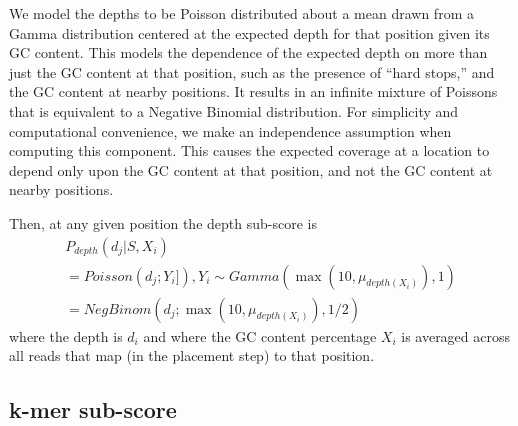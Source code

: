 \documentclass[phd,tocprelim]{cornell}
\begin{document}
We model the depths to be Poisson distributed about a mean drawn from a Gamma distribution centered at the expected depth for that position given its GC content. This models the dependence of the expected depth on more than just the GC content at that position, such as the presence of “hard stops,” and the GC content at nearby positions. It results in an infinite mixture of Poissons that is equivalent to a Negative Binomial distribution. For simplicity and computational convenience, we make an independence assumption when computing this component.  This causes the expected coverage at a location to depend only upon the GC content at that position, and not the GC content at nearby positions.

Then, at any given position the depth sub-score is
\begin{equation}
    \begin{array}{l}
        P_{depth}\left(d_{j}|S,X_{i}\right) \\
        = Poisson\left(d_{j};Y_{i}]\right), Y_{i} \sim Gamma(\max(10,\mu_{depth(X_{i})}), 1) \\
        = NegBinom(d_{j}; \max(10, \mu_{depth(X_{i})}), 1/2)
    \end{array}
\end{equation}
where the depth is $d_{i}$ and where the GC content percentage $X_{i}$ is averaged across all reads that map (in the placement step) to that position.


\subsection{k-mer sub-score} %
\label{sub:k-mer sub-score}
\end{document}
